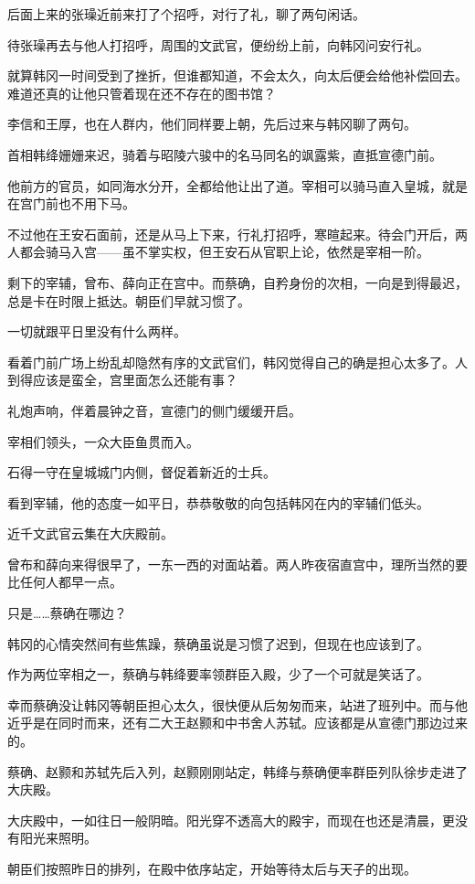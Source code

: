 后面上来的张璪近前来打了个招呼，对行了礼，聊了两句闲话。

待张璪再去与他人打招呼，周围的文武官，便纷纷上前，向韩冈问安行礼。

就算韩冈一时间受到了挫折，但谁都知道，不会太久，向太后便会给他补偿回去。难道还真的让他只管着现在还不存在的图书馆？

李信和王厚，也在人群内，他们同样要上朝，先后过来与韩冈聊了两句。

首相韩绛姗姗来迟，骑着与昭陵六骏中的名马同名的飒露紫，直抵宣德门前。

他前方的官员，如同海水分开，全都给他让出了道。宰相可以骑马直入皇城，就是在宫门前也不用下马。

不过他在王安石面前，还是从马上下来，行礼打招呼，寒暄起来。待会门开后，两人都会骑马入宫——虽不掌实权，但王安石从官职上论，依然是宰相一阶。

剩下的宰辅，曾布、薛向正在宫中。而蔡确，自矜身份的次相，一向是到得最迟，总是卡在时限上抵达。朝臣们早就习惯了。

一切就跟平日里没有什么两样。

看着门前广场上纷乱却隐然有序的文武官们，韩冈觉得自己的确是担心太多了。人到得应该是蛮全，宫里面怎么还能有事？

礼炮声响，伴着晨钟之音，宣德门的侧门缓缓开启。

宰相们领头，一众大臣鱼贯而入。

石得一守在皇城城门内侧，督促着新近的士兵。

看到宰辅，他的态度一如平日，恭恭敬敬的向包括韩冈在内的宰辅们低头。

近千文武官云集在大庆殿前。

曾布和薛向来得很早了，一东一西的对面站着。两人昨夜宿直宫中，理所当然的要比任何人都早一点。

只是……蔡确在哪边？

韩冈的心情突然间有些焦躁，蔡确虽说是习惯了迟到，但现在也应该到了。

作为两位宰相之一，蔡确与韩绛要率领群臣入殿，少了一个可就是笑话了。

幸而蔡确没让韩冈等朝臣担心太久，很快便从后匆匆而来，站进了班列中。而与他近乎是在同时而来，还有二大王赵颢和中书舍人苏轼。应该都是从宣德门那边过来的。

蔡确、赵颢和苏轼先后入列，赵颢刚刚站定，韩绛与蔡确便率群臣列队徐步走进了大庆殿。

大庆殿中，一如往日一般阴暗。阳光穿不透高大的殿宇，而现在也还是清晨，更没有阳光来照明。

朝臣们按照昨日的排列，在殿中依序站定，开始等待太后与天子的出现。

